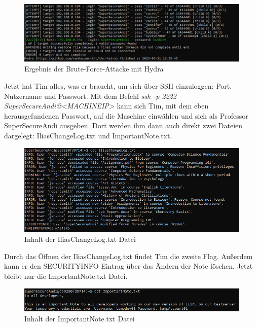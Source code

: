 \documentclass[10pt, a4paper,onecolumn ,titlepage]{article}
\begin{document}
    \begin{figure}[H]
        \centering
        \includegraphics[width=1\textwidth]{VM1_Bilder/HydraBruteforce.PNG}
        \caption{Ergebnis der Brute-Force-Attacke mit Hydra}
        \label{fig:HydraBruteforce}
    \end{figure}

    \noindent
    Jetzt hat Tim alles, was er braucht, um sich über SSH einzuloggen: Port, Nutzername und Passwort.
    Mit dem Befehl \textit{ssh -p 2222 SuperSecureAndi@<MACHINEIP>} kann sich Tim, mit dem eben herausgefundenen Passwort, auf die Maschine einwählen und sich als Professor SuperSecureAndi ausgeben.
    Dort werden ihm dann auch direkt zwei Dateien dargelegt: IliasChangeLog.txt und ImportantNote.txt.

    \begin{figure}[H]
        \centering
        \includegraphics[width=1\textwidth]{VM1_Bilder/IliasChangelog.PNG}
        \caption{Inhalt der IliasChangeLog.txt Datei}
        \label{fig:IliasChangelog}
    \end{figure}

    \noindent
    Durch das Öffnen der IliasChangeLog.txt findet Tim die zweite Flag.
    Außerdem kann er den SECURITYINFO Eintrag über das Ändern der Note löschen.
    Jetzt bleibt nur die ImportantNote.txt Datei.

    \begin{figure}[H]
        \centering
        \includegraphics[width=1\textwidth]{VM1_Bilder/ImportantNote.PNG}
        \caption{Inhalt der ImportantNote.txt Datei}
        \label{fig:ImportantNote}
    \end{figure}
\end{document}
